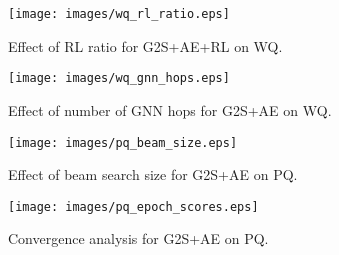 \documentclass[journal]{IEEEtran}
\begin{document}
\begin{table}[!htb]
\vspace{-3mm}
\caption{Results of RL-based G2S+AE on PQ.}
\label{table:pq_rl_results}
\begin{center}
\addtolength{\tabcolsep}{-3.8pt}
\end{center}
\vspace{-2mm}

\end{table}



\begin{figure}[!htb]
  \vspace{-1mm}
  \centering
   \texttt{[image: images/wq\_rl\_ratio.eps]}
  \caption{Effect of RL ratio for G2S+AE+RL on WQ.}
  \label{fig:rl_ratio}
  \vspace{-2mm}
\end{figure}


\begin{figure}[!htb]
  \vspace{-2mm}
  \centering
    \texttt{[image: images/wq\_gnn\_hops.eps]}
  \caption{Effect of number of GNN hops for G2S+AE on WQ.}
  \label{fig:gnn_hops}
  \vspace{-1mm}
\end{figure}




\begin{figure}[!htb]
  \vspace{-2mm}
  \centering
   \texttt{[image: images/pq\_beam\_size.eps]}
  \caption{Effect of beam search size for G2S+AE on PQ.}
  \label{fig:beam_size}
  \vspace{-2mm}
\end{figure}




\begin{figure}[!htb]
  \vspace{-1mm}
  \centering
   \texttt{[image: images/pq\_epoch\_scores.eps]}
  \caption{Convergence analysis for G2S+AE on PQ.}
  \label{fig:convergence}
  \vspace{-4mm}
\end{figure}
\end{document}

